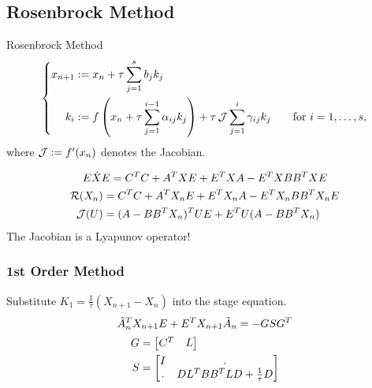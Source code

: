 \subsection{Rosenbrock Method}

\begin{frame}
  \begin{block}{Rosenbrock Method}
    \begin{equation*}
    \left\{
    \begin{aligned}
      x_{n+1} &:= x_n + \tau \sum_{j=1}^s b_j k_j
      \\
      k_i &:= f\left( x_n + \tau \sum_{j=1}^{i-1} \alpha_{ij} k_j \right) + \tau \operatorname{\mathcal J} \sum_{j=1}^i \gamma_{ij} k_j
      \qquad
      \text{for } i = 1, \ldots, s
      ,
    \end{aligned}
    \right.
    \end{equation*}
    where $\operatorname{\mathcal J} := f'(x_n)$ denotes the Jacobian.
  \end{block}
\end{frame}

\begin{frame}
  \begin{equation*}
    E\dot X E = C^T C + A^T X E + E^T X A - E^T X BB^T X E
  \end{equation*}
  \begin{align*}
    \operatorname{\mathcal R}(X_n) &= C^T C + A^T X_n E + E^T X_n A - E^T X_n BB^T X_n E \\
    \operatorname{\mathcal J}(U) &= (A - BB^T X_n)^T U E + E^T U (A - BB^T X_n)
  \end{align*}
  The Jacobian is a Lyapunov operator!
\end{frame}

\begin{frame}
  \frametitle{1st Order Method \parencite{Mena2007,Lang2017}}
  Substitute $K_1 = \frac{1}{\tau}(X_{n+1} - X_n)$ into the stage equation.
  \begin{equation*}
    \tilde A_n^T X_{n+1} E + E^T X_{n+1} \tilde A_n
    = - GSG^T
  \end{equation*}
  \begin{align*}
    G &= \begin{bmatrix}
      C^T & L
    \end{bmatrix}
    \\
    S &= \begin{bmatrix}
      I & . \\
      . & DL^T BB^T LD + \tfrac{1}{\tau} D
    \end{bmatrix}
  \end{align*}
\end{frame}

